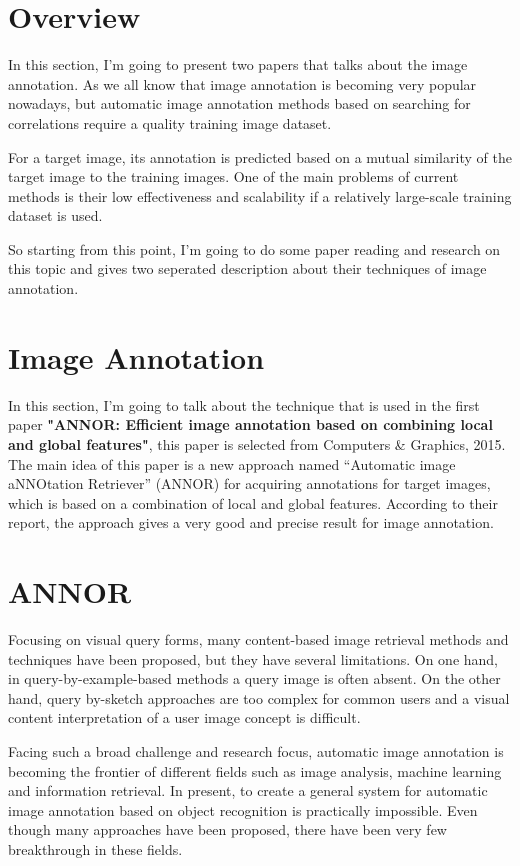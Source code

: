 \documentclass[pdftex,12pt,a4paper]{article}
\begin{document}


\section{Overview}

In this section, I'm going to present two papers that talks about the image annotation. As we
all know that image annotation is becoming very popular nowadays, but automatic image annotation methods based on searching for correlations require a quality training image dataset. 

For a target image, its annotation is predicted based on a mutual similarity of the target image to the training images. One of the main problems of current methods is their low effectiveness and scalability if a relatively large-scale training dataset is used.

So starting from this point, I'm going to do some paper reading and research on this topic and gives two seperated
description about their techniques of image annotation.

\section{Image Annotation}
In this section, I'm going to talk about the technique that is used in the first paper \textbf{"ANNOR: Efficient image annotation based on combining local and global features"}, this paper is selected from Computers \& Graphics, 2015. The main idea of this paper is a new approach named
“Automatic image aNNOtation Retriever” (ANNOR) for acquiring annotations for target images, which is
based on a combination of local and global features. According to their report, the approach gives a very good and precise result for image annotation.

\section{ANNOR}
Focusing on visual query forms, many content-based image retrieval methods and techniques have been proposed,
but they have several limitations. On one hand, in query-by-example-based
methods a query image is often absent. On the other hand, query by-sketch
approaches are too complex for common users and
a visual content interpretation of a user image concept is difficult.

Facing such a broad challenge and research focus, automatic image annotation is becoming the frontier of 
different fields such as image analysis, machine learning and information retrieval. In
present, to create a general system for automatic image annotation
based on object recognition is practically impossible. Even though many approaches have been proposed, there
have been very few breakthrough in these fields.
\end{document}
